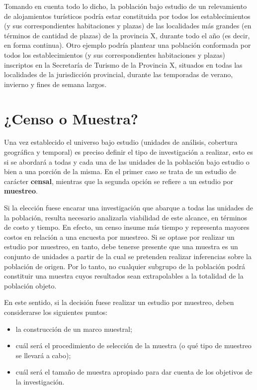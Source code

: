 \documentclass[
]{book}
\begin{document}
Tomando en cuenta todo lo dicho, la población bajo estudio de un relevamiento de alojamientos turísticos podría estar constituida por todos los establecimientos (y sus correspondientes habitaciones y plazas) de las localidades más grandes (en términos de cantidad de plazas) de la provincia X, durante todo el año (es decir, en forma continua). Otro ejemplo podría plantear una población conformada por todos los establecimientos (y sus correspondientes habitaciones y plazas) inscriptos en la Secretaría de Turismo de la Provincia X, situados en todas las localidades de la jurisdicción provincial, durante las temporadas de verano, invierno y fines de semana largos.

\hypertarget{censo-o-muestra}{%
\section{¿Censo o Muestra?}\label{censo-o-muestra}}

Una vez establecido el universo bajo estudio (unidades de análisis, cobertura geográfica y temporal) es preciso definir el tipo de investigación a realizar, esto es si se abordará a todas y cada una de las unidades de la población bajo estudio o bien a una porción de la misma. En el primer caso se trata de un estudio de carácter \textbf{censal}, mientras que la segunda opción se refiere a un estudio por \textbf{muestreo}.

Si la elección fuese encarar una investigación que abarque a todas las unidades de la población, resulta necesario analizarla viabilidad de este alcance, en términos de costo y tiempo. En efecto, un censo insume más tiempo y representa mayores costos en relación a una encuesta por muestreo. Si se optase por realizar un estudio por muestreo, en tanto, debe tenerse presente que una muestra es un conjunto de unidades a partir de la cual se pretenden realizar inferencias sobre la población de origen. Por lo tanto, no cualquier subgrupo de la población podrá constituir una muestra cuyos resultados sean extrapolables a la totalidad de la población objeto.

En este sentido, si la decisión fuese realizar un estudio por muestreo, deben considerarse los siguientes puntos:

\begin{itemize}
\item
  la construcción de un marco muestral;
\item
  cuál será el procedimiento de selección de la muestra (o qué tipo de muestreo se llevará a cabo);
\item
  cuál será el tamaño de muestra apropiado para dar cuenta de los objetivos de la investigación.
\end{itemize}
\end{document}

